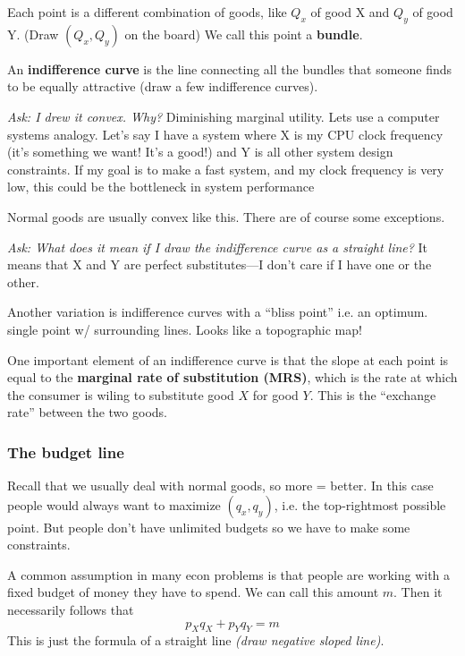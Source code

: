 \documentclass[11pt]{article}
\begin{document}
Each point is a different combination of goods, like $Q_x$ of good X and $Q_y$ of good Y. (Draw $(Q_x, Q_y)$ on the board) We call this point a {\bf bundle}.

An {\bf indifference curve} is the line connecting all the bundles that someone finds to be equally attractive (draw a few indifference curves).

{\it Ask: I drew it convex. Why?} Diminishing marginal utility. Lets use a computer systems analogy. Let's say I have a system where X is my CPU clock frequency (it's something we want! It's a good!) and Y is all other system design constraints. If my goal is to make a fast system, and my clock frequency is very low, this could be the bottleneck in system performance

Normal goods are usually convex like this. There are of course some exceptions.

{\it Ask: What does it mean if I draw the indifference curve as a straight line?} It means that X and Y are perfect substitutes---I don't care if I have one or the other. 

Another variation is indifference curves with a ``bliss point'' i.e. an optimum. single point w/ surrounding lines. Looks like a topographic map!

One important element of an indifference curve is that the slope at each point is equal to the {\bf marginal rate of substitution (MRS)}, which is the rate at which the consumer is wiling to substitute good $X$ for good $Y$. This is the ``exchange rate'' between the two goods.

\subsubsection{The budget line}

Recall that we usually deal with normal goods, so more = better. In this case people would always want to maximize $(q_x, q_y)$, i.e. the top-rightmost possible point. But people don't have unlimited budgets so we have to make some constraints.

A common assumption in many econ problems is that people are working with a fixed budget of money they have to spend. We can call this amount $m$. Then it necessarily follows that
$$p_Xq_X + p_Yq_Y = m$$
This is just the formula of a straight line {\it (draw negative sloped line)}.
\end{document}
